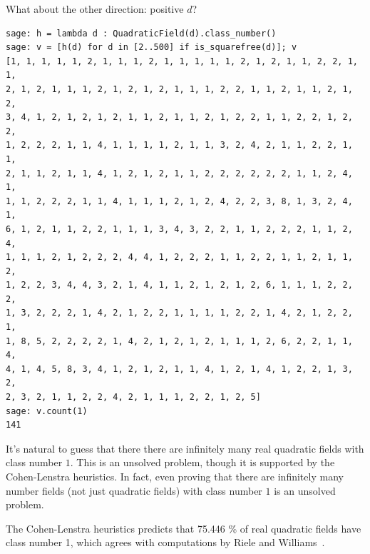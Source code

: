 \documentclass{book}
\begin{document}
What about the other direction: positive $d$?
\begin{lstlisting}
sage: h = lambda d : QuadraticField(d).class_number()
sage: v = [h(d) for d in [2..500] if is_squarefree(d)]; v
[1, 1, 1, 1, 1, 2, 1, 1, 1, 2, 1, 1, 1, 1, 1, 2, 1, 2, 1, 1, 2, 2, 1, 1,
2, 1, 2, 1, 1, 1, 2, 1, 2, 1, 2, 1, 1, 1, 2, 2, 1, 1, 2, 1, 1, 2, 1, 2,
3, 4, 1, 2, 1, 2, 1, 2, 1, 1, 2, 1, 1, 2, 1, 2, 2, 1, 1, 2, 2, 1, 2, 2,
1, 2, 2, 2, 1, 1, 4, 1, 1, 1, 1, 2, 1, 1, 3, 2, 4, 2, 1, 1, 2, 2, 1, 1,
2, 1, 1, 2, 1, 1, 4, 1, 2, 1, 2, 1, 1, 2, 2, 2, 2, 2, 2, 1, 1, 2, 4, 1,
1, 1, 2, 2, 2, 1, 1, 4, 1, 1, 1, 2, 1, 2, 4, 2, 2, 3, 8, 1, 3, 2, 4, 1,
6, 1, 2, 1, 1, 2, 2, 1, 1, 1, 3, 4, 3, 2, 2, 1, 1, 2, 2, 2, 1, 1, 2, 4,
1, 1, 1, 2, 1, 2, 2, 2, 4, 4, 1, 2, 2, 2, 1, 1, 2, 2, 1, 1, 2, 1, 1, 2,
1, 2, 2, 3, 4, 4, 3, 2, 1, 4, 1, 1, 2, 1, 2, 1, 2, 6, 1, 1, 1, 2, 2, 2,
1, 3, 2, 2, 2, 1, 4, 2, 1, 2, 2, 1, 1, 1, 1, 2, 2, 1, 4, 2, 1, 2, 2, 1,
1, 8, 5, 2, 2, 2, 2, 1, 4, 2, 1, 2, 1, 2, 1, 1, 1, 2, 6, 2, 2, 1, 1, 4,
4, 1, 4, 5, 8, 3, 4, 1, 2, 1, 2, 1, 1, 4, 1, 2, 1, 4, 1, 2, 2, 1, 3, 2,
2, 3, 2, 1, 1, 2, 2, 4, 2, 1, 1, 1, 2, 2, 1, 2, 5]
sage: v.count(1)
141
\end{lstlisting}
It's natural to guess that there there are infinitely many
real quadratic fields with class number $1$.
This is an unsolved problem, though it is supported
by the Cohen-Lenstra heuristics.   In fact, even proving
that there are infinitely many number fields (not just quadratic
fields) with class number $1$ is an unsolved problem.



The Cohen-Lenstra heuristics \cite{cohen-lenstra:heuristics} predicts
that 75.446 \% of real quadratic fields have class number 1, which agrees
with computations by Riele and Williams~\cite{riele2003new}.

\end{document}
